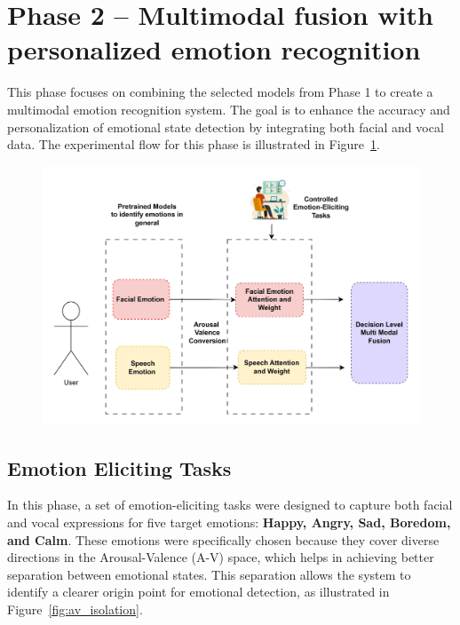 \section{Phase 2 – Multimodal fusion with personalized emotion recognition}
\label{sec:exp-phase2}

This phase focuses on combining the selected models from Phase 1 to create a multimodal emotion recognition system. The goal is to enhance the accuracy and personalization of emotional state detection by integrating both facial and vocal data. The experimental flow for this phase is illustrated in Figure~\ref{fig:phase2}.

\begin{figure}[h]
    \centering
    \includegraphics[width=1\textwidth]{img/chapter_03/Phase2.jpg}
    \label{fig:phase2}
\end{figure}

\subsection{Emotion Eliciting Tasks}
\label{sec:eliciting-tasks}

In this phase, a set of emotion-eliciting tasks were designed to capture both facial and vocal expressions for five target emotions: \textbf{Happy, Angry, Sad, Boredom, and Calm}. These emotions were specifically chosen because they cover diverse directions in the Arousal-Valence (A-V) space, which helps in achieving better separation between emotional states. This separation allows the system to identify a clearer origin point for emotional detection, as illustrated in Figure~\ref{fig:av_isolation}.

